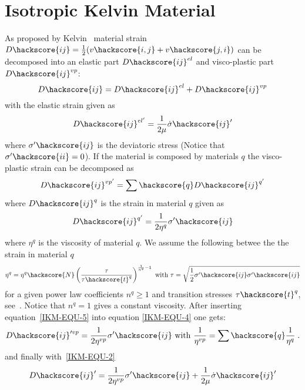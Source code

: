 \section{Isotropic Kelvin Material \label{IKM}}
As proposed by Kelvin~\cite{Muhlhaus2005} material strain $D\hackscore{ij}=\frac{1}{2}(v\hackscore{i,j}+v\hackscore{j,i})$ can be decomposed into
an elastic part $D\hackscore{ij}^{el}$ and visco-plastic part $D\hackscore{ij}^{vp}$:
\begin{equation}\label{IKM-EQU-2}
D\hackscore{ij}=D\hackscore{ij}^{el}+D\hackscore{ij}^{vp}
\end{equation}
with the elastic strain given as 
\begin{equation}\label{IKM-EQU-3}
D\hackscore{ij}^{el'}=\frac{1}{2 \mu} \dot{\sigma}\hackscore{ij}'
\end{equation}
where $\sigma'\hackscore{ij}$ is the deviatoric stress (Notice that $\sigma'\hackscore{ii}=0$).
If the material is composed by materials $q$ the visco-plastic strain can be decomposed as
\begin{equation}\label{IKM-EQU-4}
D\hackscore{ij}^{vp'}=\sum\hackscore{q} D\hackscore{ij}^{q'} 
\end{equation}
where $D\hackscore{ij}^{q}$ is the strain in material $q$ given as 
\begin{equation}\label{IKM-EQU-5}
D\hackscore{ij}^{q'}=\frac{1}{2 \eta^{q}} \sigma'\hackscore{ij} 
\end{equation}
where $\eta^{q}$ is the viscosity of material $q$. We assume the following 
betwee the the strain in material $q$ 
\begin{equation}\label{IKM-EQU-5b}
\eta^{q}=\eta^{q}\hackscore{N} \left(\frac{\tau}{\tau\hackscore{t}^q}\right)^{\frac{1}{n^{q}}-1}
\mbox{ with } \tau=\sqrt{\frac{1}{2}\sigma'\hackscore{ij} \sigma'\hackscore{ij}}
\end{equation}
for a given power law coefficients $n^{q}\ge1$ and transition stresses $\tau\hackscore{t}^q$, see~\cite{Muhlhaus2005}.
Notice that $n^{q}=1$ gives a constant viscosity.
After inserting equation~\ref{IKM-EQU-5} into equation \ref{IKM-EQU-4} one gets:
\begin{equation}\label{IKM-EQU-6}
D\hackscore{ij}'^{vp}=\frac{1}{2 \eta^{vp}} \sigma'\hackscore{ij} \mbox{ with } \frac{1}{\eta^{vp}} = \sum\hackscore{q} \frac{1}{\eta^{q}} \;.
\end{equation}
and finally with~\ref{IKM-EQU-2} 
\begin{equation}\label{IKM-EQU-2bb}
D\hackscore{ij}'=\frac{1}{2 \eta^{vp}} \sigma'\hackscore{ij}+\frac{1}{2 \mu} \dot{\sigma}\hackscore{ij}'
\end{equation}
